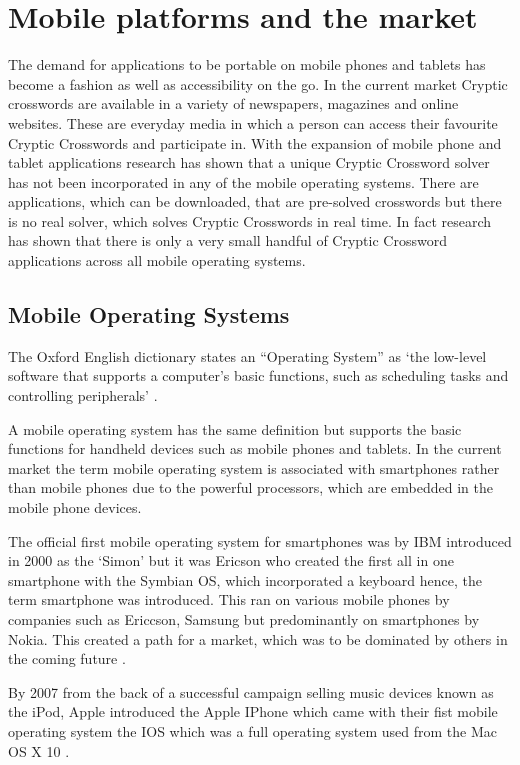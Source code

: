 \section{Mobile platforms and the market}

The demand for applications to be portable on mobile phones and tablets has
become a fashion as well as accessibility on the go. In the current market
Cryptic crosswords are available in a variety of newspapers, magazines and
online websites. These are everyday media in which a person can access their
favourite Cryptic Crosswords and participate in. With the expansion of mobile
phone and tablet applications research has shown that a unique Cryptic Crossword
solver has not been incorporated in any of the mobile operating systems. There
are applications, which can be downloaded, that are pre-solved crosswords but
there is no real solver, which solves Cryptic Crosswords in real time. In fact
research has shown that there is only a very small handful of Cryptic Crossword
applications across all mobile operating systems.

\subsection{Mobile Operating Systems}

The Oxford English dictionary states an ``Operating System'' as `the low-level
software that supports a computer’s basic functions, such as scheduling tasks
and controlling peripherals' \citep{oxford_dictionary11}.

A mobile operating system has the same definition but supports the basic
functions for handheld devices such as mobile phones and tablets. In the current
market the term mobile operating system is associated with smartphones rather
than mobile phones due to the powerful processors, which are embedded in the
mobile phone devices.

The official first mobile operating system for smartphones was by IBM introduced
in 2000 as the `Simon' but it was Ericson who created the first all in one
smartphone with the Symbian OS, which incorporated a keyboard hence, the term
smartphone was introduced. This ran on various mobile phones by companies such
as Ericcson, Samsung but predominantly on smartphones by Nokia. This created a
path for a market, which was to be dominated by others in the coming future
\citep{smartphone11}.

By 2007 from the back of a successful campaign selling music devices known as
the iPod, Apple introduced the Apple IPhone which came with their fist mobile
operating system the IOS which was a full operating system used from the Mac OS
X 10 \citep{macworld07}.

